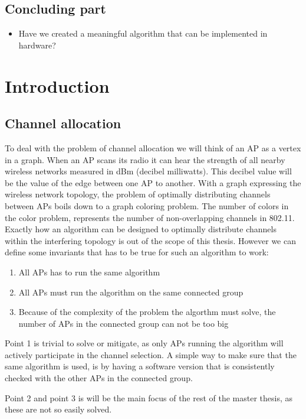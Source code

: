 \documentclass[a4paper,UKenglish]{report}
\begin{document}
\section {Concluding part}
\begin{itemize} 
	\item Have we created a meaningful algorithm that can be implemented in hardware?
\end{itemize}

\clearpage
\chapter{Introduction}
\section{Channel allocation} 
To deal with the problem of channel allocation we will think of an AP as a vertex in a graph. When an AP scans its radio
it can hear the strength of all nearby wireless networks measured in dBm (decibel milliwatts). This decibel value will be
the value of the edge between one AP to another. With a graph expressing the wireless network topology, the problem
of optimally distributing channels between APs boils down to a graph coloring problem. The number of colors in the color problem,
represents the number of non-overlapping channels in 802.11. Exactly how an algorithm can be designed to optimally distribute channels within the
interfering topology is out of the scope of this thesis. However we can define some invariants that has to be true
for such an algorithm to work:
\begin{enumerate} 
	\item All APs has to run the same algorithm
	\item All APs must run the algorithm on the same connected group
	\item Because of the complexity of the problem the algorthm must solve, the number of APs in the connected group can not be too big
\end{enumerate}

Point 1 is trivial to solve or mitigate, as only APs running the algorithm will actively participate in the channel selection. A simple way to make sure that the
same algorithm is used, is by having a software version that is consistently checked with the other APs in the connected group.

Point 2 and point 3 is will be the main focus of the rest of the master thesis, as these are not so easily solved.
\end{document}
